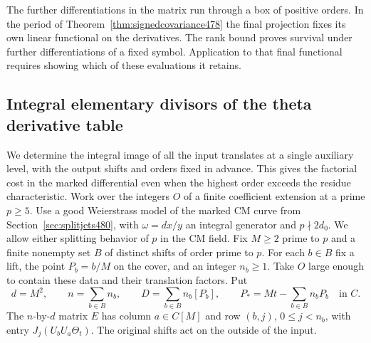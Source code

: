 \documentclass[a4paper,11pt]{article}
\theoremstyle{definition}
\theoremstyle{remark}
\numberwithin{equation}{section}
\begin{document}
The further differentiations in the matrix run through a box
of positive orders. In the period of
Theorem~\ref{thm:signedcovariance478} the final projection fixes
its own linear functional on the derivatives. The rank bound
proves survival under further differentiations of a fixed
symbol. Application to that final functional requires showing
which of these evaluations it retains.


\subsection{Integral elementary divisors of the theta derivative table}
\label{sec:jetsmith485}

We determine the integral image of all the input translates at
a single auxiliary level, with the output shifts and orders fixed
in advance. This gives the factorial cost in the marked
differential even when the highest order exceeds the residue
characteristic. Work over the integers \(O\) of a finite
coefficient extension at a prime \(p\ge5\). Use a good
Weierstrass model of the marked CM curve from
Section~\ref{sec:splitjets480}, with \(\omega=dx/y\) an integral
generator and \(p\nmid 2d_0\). We allow either splitting behavior
of \(p\) in the CM field. Fix \(M\ge2\) prime to \(p\) and a
finite nonempty set \(B\) of distinct shifts of order prime to
\(p\). For each \(b\in B\) fix a lift, the point \(P_b=b/M\) on
the cover, and an integer \(n_b\ge1\). Take \(O\) large enough
to contain these data and their translation factors. Put
\[
 d=M^2,\qquad n=\sum_{b\in B}n_b,\qquad
   D=\sum_{b\in B}n_b[P_b],\qquad
   P_*=Mt-\sum_{b\in B}n_bP_b\quad\text{in } C.
\]
The \(n\)-by-\(d\) matrix \(E\) has column \(a\in C[M]\) and row
\((b,j)\), \(0\le j<n_b\), with entry
\(J_j(U_bU_a\Theta_t)\). The original shifts act on the outside
of the input.
\end{document}
